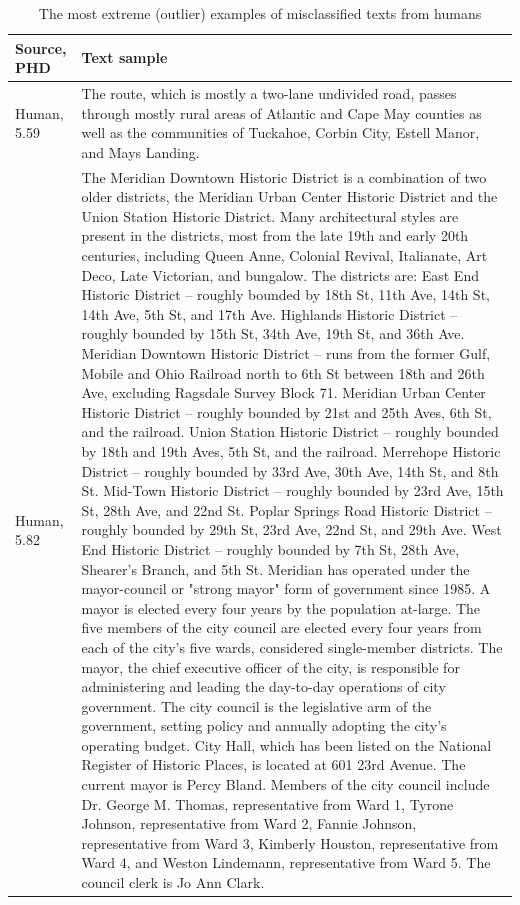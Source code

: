 \documentclass{article}
\begin{document}
\begin{table}%
    \centering
    \begin{tabular}{p{}p{}}%
         Source, PHD & Text sample \\
          \hline
        Human, 5.59 & The route, which is mostly a two-lane undivided road, passes through mostly rural areas of Atlantic and Cape May counties as well as the communities of Tuckahoe, Corbin City, Estell Manor, and Mays Landing. \\
         \hline
         Human, 5.82 & The Meridian Downtown Historic District is a combination of two older districts, the Meridian Urban Center Historic District and the Union Station Historic District. Many architectural styles are present in the districts, most from the late 19th and early 20th centuries, including Queen Anne, Colonial Revival, Italianate, Art Deco, Late Victorian, and bungalow. The districts are: East End Historic District – roughly bounded by 18th St, 11th Ave, 14th St, 14th Ave, 5th St, and 17th Ave. Highlands Historic District – roughly bounded by 15th St, 34th Ave, 19th St, and 36th Ave. Meridian Downtown Historic District – runs from the former Gulf, Mobile and Ohio Railroad north to 6th St between 18th and 26th Ave, excluding Ragsdale Survey Block 71. Meridian Urban Center Historic District – roughly bounded by 21st and 25th Aves, 6th St, and the railroad. Union Station Historic District – roughly bounded by 18th and 19th Aves, 5th St, and the railroad. Merrehope Historic District – roughly bounded by 33rd Ave, 30th Ave, 14th St, and 8th St. Mid-Town Historic District – roughly bounded by 23rd Ave, 15th St, 28th Ave, and 22nd St. Poplar Springs Road Historic District – roughly bounded by 29th St, 23rd Ave, 22nd St, and 29th Ave. West End Historic District – roughly bounded by 7th St, 28th Ave, Shearer's Branch, and 5th St. Meridian has operated under the mayor-council or "strong mayor" form of government since 1985. A mayor is elected every four years by the population at-large. The five members of the city council are elected every four years from each of the city's five wards, considered single-member districts. The mayor, the chief executive officer of the city, is responsible for administering and leading the day-to-day operations of city government. The city council is the legislative arm of the government, setting policy and annually adopting the city's operating budget. City Hall, which has been listed on the National Register of Historic Places, is located at 601 23rd Avenue. The current mayor is Percy Bland. Members of the city council include Dr. George M. Thomas, representative from Ward 1, Tyrone Johnson, representative from Ward 2, Fannie Johnson, representative from Ward 3, Kimberly Houston, representative from Ward 4, and Weston Lindemann, representative from Ward 5. The council clerk is Jo Ann Clark. \\
    \end{tabular}
    \caption{The most extreme (outlier) examples of misclassified texts from humans}
    \label{tab:misclassified_human}
\end{table}
\end{document}
